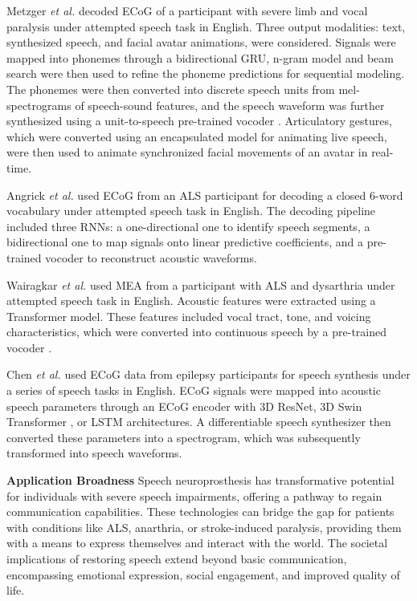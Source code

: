 \documentclass[journal]{IEEEtran}
\begin{document}
Metzger \emph{et al.} \cite{Metzger2023} decoded ECoG of a participant with severe limb and vocal paralysis under attempted speech task in English. Three output modalities: text, synthesized speech, and facial avatar animations, were considered. Signals were mapped into phonemes through a bidirectional GRU, n-gram model and beam search were then used to refine the phoneme predictions for sequential modeling. The phonemes were then converted into discrete speech units from mel-spectrograms of speech-sound features, and the speech waveform was further synthesized using a unit-to-speech pre-trained vocoder \cite{Lee2022a}. Articulatory gestures, which were converted using an encapsulated model for animating live speech, were then used to animate synchronized facial movements of an avatar in real-time.

Angrick \emph{et al.} \cite{Angrick2024} used ECoG from an ALS participant for decoding a closed 6-word vocabulary under attempted speech task in English. The decoding pipeline included three RNNs: a one-directional one to identify speech segments, a bidirectional one to map signals onto linear predictive coefficients, and a pre-trained vocoder \cite{Valin2019} to reconstruct acoustic waveforms.

Wairagkar \emph{et al.} \cite{Wairagkar2024} used MEA from a participant with ALS and dysarthria under attempted speech task in English. Acoustic features were extracted using a Transformer model. These features included vocal tract, tone, and voicing characteristics, which were converted into continuous speech by a pre-trained vocoder \cite{Valin2019}.

Chen \emph{et al.} \cite{Chen2024} used ECoG data from epilepsy participants for speech synthesis under a series of speech tasks in English. ECoG signals were mapped into acoustic speech parameters through an ECoG encoder with 3D ResNet, 3D Swin Transformer \cite{Liu2021}, or LSTM architectures. A differentiable speech synthesizer then converted these parameters into a spectrogram, which was subsequently transformed into speech waveforms.

\textbf{Application Broadness} Speech neuroprosthesis has transformative potential for individuals with severe speech impairments, offering a pathway to regain communication capabilities. These technologies can bridge the gap for patients with conditions like ALS, anarthria, or stroke-induced paralysis, providing them with a means to express themselves and interact with the world. The societal implications of restoring speech extend beyond basic communication, encompassing emotional expression, social engagement, and improved quality of life.
\end{document}
